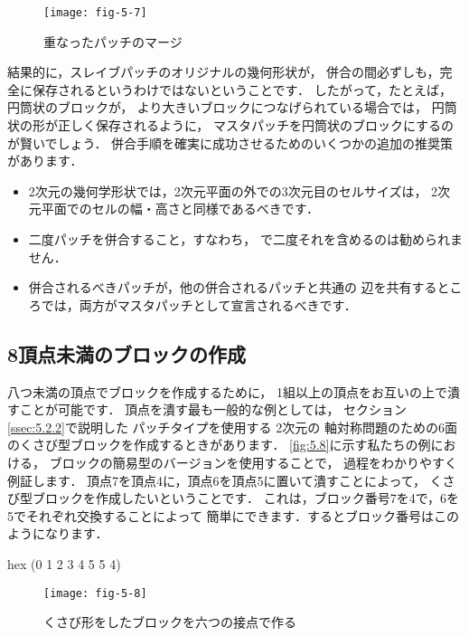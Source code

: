 \begin{figure}[ht]
 \texttt{[image: fig-5-7]}
 \caption{重なったパッチのマージ}
 \label{fig:5.7}
\end{figure}


結果的に，スレイブパッチのオリジナルの幾何形状が，
併合の間必ずしも，完全に保存されるというわけではないということです．
したがって，たとえば，円筒状のブロックが，
より大きいブロックにつなげられている場合では，
円筒状の形が正しく保存されるように，
マスタパッチを円筒状のブロックにするのが賢いでしょう．
併合手順を確実に成功させるためのいくつかの追加の推奨策があります．
\begin{itemize}
 \item 2次元の幾何学形状では，2次元平面の外での3次元目のセルサイズは，
       2次元平面でのセルの幅・高さと同様であるべきです．
 \item 二度パッチを併合すること，すなわち，
       で二度それを含めるのは勧められません．
 \item 併合されるべきパッチが，他の併合されるパッチと共通の
       辺を共有するところでは，両方がマスタパッチとして宣言されるべきです．
\end{itemize}


\subsection{8頂点未満のブロックの作成}
\label{ssec:5.3.3}
八つ未満の頂点でブロックを作成するために，
1組以上の頂点をお互いの上で潰すことが可能です．
頂点を潰す最も一般的な例としては，
セクション\autoref{ssec:5.2.2}で説明した
%
%
パッチタイプを使用する
2次元の%
%
軸対称問題のための6面のくさび型ブロックを作成するときがあります．
\autoref{fig:5.8}に示す私たちの例における，
ブロックの簡易型のバージョンを使用することで，
過程をわかりやすく例証します．
頂点7を頂点4に，頂点6を頂点5に置いて潰すことによって，
くさび型ブロックを作成したいということです．
これは，ブロック番号7を4で，6を5でそれぞれ交換することによって
簡単にできます．するとブロック番号はこのようになります．
\begin{OFverbatim}[file]
hex (0 1 2 3 4 5 5 4)
\end{OFverbatim}


\begin{figure}[ht]
 \texttt{[image: fig-5-8]}
 \caption{くさび形をしたブロックを六つの接点で作る}
 \label{fig:5.8}
\end{figure}



